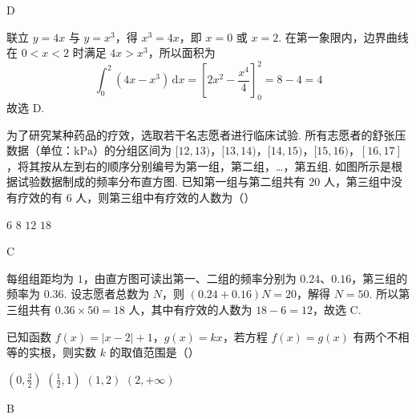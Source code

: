 \begin{answer}
D
\end{answer}

\begin{solution}
联立 \(y=4x\) 与 \(y=x^3\)，得 \(x^3=4x\)，即 \(x=0\) 或 \(x=2\). 在第一象限内，边界曲线在 \(0<x<2\) 时满足 \(4x>x^3\)，所以面积为
\[
\int_0^2(4x-x^3)\,\mathrm dx
=\left[2x^2-\frac{x^4}{4}\right]_0^2=8-4=4
\]
故选 D.
\end{solution}

\begin{problem}
为了研究某种药品的疗效，选取若干名志愿者进行临床试验. 所有志愿者的舒张压数据（单位：\(\mathrm{kPa}\)）的分组区间为 \([12, 13)\)，\([13, 14)\)，\([14, 15)\)，\([15, 16)\)，\([16, 17]\)，将其按从左到右的顺序分别编号为第一组，第二组，…，第五组. 如图所示是根据试验数据制成的频率分布直方图. 已知第一组与第二组共有 \(20\text{ 人}\)，第三组中没有疗效的有 \(6\text{ 人}\)，则第三组中有疗效的人数为（\quad）


\choices
    {\(6\)}
    {\(8\)}
    {\(12\)}
    {\(18\)}
\end{problem}

\begin{answer}
C
\end{answer}

\begin{solution}
每组组距均为 \(1\)，由直方图可读出第一、二组的频率分别为 \(0.24\)、\(0.16\)，第三组的频率为 \(0.36\). 设志愿者总数为 \(N\)，则
\((0.24+0.16)N=20\)，解得 \(N=50\). 所以第三组共有 \(0.36\times50=18\) 人，其中有疗效的人数为 \(18-6=12\)，故选 C.
\end{solution}

\begin{problem}
已知函数 \( f(x) = |x - 2| + 1 \)，\( g(x) = kx \)，若方程 \( f(x) = g(x) \) 有两个不相等的实根，则实数 \( k \) 的取值范围是（\quad）

\choices
    {\(\left(0, \frac{3}{2}\right)\)}
    {\(\left(\frac{1}{2},1\right)\)}
    {\((1,2)\)}
    {\((2, +\infty)\)}
\end{problem}

\begin{answer}
B
\end{answer}

